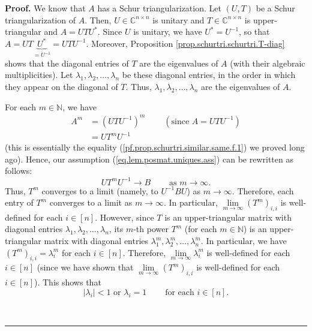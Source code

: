 \documentclass[numbers=enddot,12pt,final,onecolumn,notitlepage]{scrartcl}%
\numberwithin{exer}{subsection}
\theoremstyle{definition}
\newenvironment{proof}[1][Proof]{\noindent\textbf{#1.} }{\ \rule{0.5em}{0.5em}}
\begin{document}
\begin{proof}
We know that $A$ has a Schur triangularization. Let $\left(  U,T\right)  $ be
a Schur triangularization of $A$. Then, $U\in\mathbb{C}^{n\times n}$ is
unitary and $T\in\mathbb{C}^{n\times n}$ is upper-triangular and $A=UTU^{\ast
}$. Since $U$ is unitary, we have $U^{\ast}=U^{-1}$, so that
$A=UT\underbrace{U^{\ast}}_{=U^{-1}}=UTU^{-1}$. Moreover, Proposition
\ref{prop.schurtri.schurtri.T-diag} shows that the diagonal entries of $T$ are
the eigenvalues of $A$ (with their algebraic multiplicities). Let $\lambda
_{1},\lambda_{2},\ldots,\lambda_{n}$ be these diagonal entries, in the order
in which they appear on the diagonal of $T$. Thus, $\lambda_{1},\lambda
_{2},\ldots,\lambda_{n}$ are the eigenvalues of $A$.

For each $m\in\mathbb{N}$, we have%
\begin{align*}
A^{m}  &  =\left(  UTU^{-1}\right)  ^{m}\ \ \ \ \ \ \ \ \ \ \left(
\text{since }A=UTU^{-1}\right) \\
&  =UT^{m}U^{-1}%
\end{align*}
(this is essentially the equality (\ref{pf.prop.schurtri.similar.same.f.1}) we
proved long ago). Hence, our assumption (\ref{eq.lem.posmat.uniques.ass}) can
be rewritten as follows:
\begin{equation}
UT^{m}U^{-1}\rightarrow B\ \ \ \ \ \ \ \ \ \ \text{as }m\rightarrow\infty.
\label{pf.lem.posmat.uniques.1}%
\end{equation}
Thus, $T^{m}$ converges to a limit (namely, to $U^{-1}BU$) as $m\rightarrow
\infty$. Therefore, each entry of $T^{m}$ converges to a limit as
$m\rightarrow\infty$. In particular, $\lim\limits_{m\rightarrow\infty}\left(
T^{m}\right)  _{i,i}$ is well-defined for each $i\in\left[  n\right]  $.
However, since $T$ is an upper-triangular matrix with diagonal entries
$\lambda_{1},\lambda_{2},\ldots,\lambda_{n}$, its $m$-th power $T^{m}$ (for
each $m\in\mathbb{N}$) is an upper-triangular matrix with diagonal entries
$\lambda_{1}^{m},\lambda_{2}^{m},\ldots,\lambda_{n}^{m}$. In particular, we
have $\left(  T^{m}\right)  _{i,i}=\lambda_{i}^{m}$ for each $i\in\left[
n\right]  $. Therefore, $\lim\limits_{m\rightarrow\infty}\lambda_{i}^{m}$ is
well-defined for each $i\in\left[  n\right]  $ (since we have shown that
$\lim\limits_{m\rightarrow\infty}\left(  T^{m}\right)  _{i,i}$ is well-defined
for each $i\in\left[  n\right]  $). This shows that
\begin{equation}
\left\vert \lambda_{i}\right\vert <1\text{ or }\lambda_{i}%
=1\ \ \ \ \ \ \ \ \ \ \text{for each }i\in\left[  n\right]  .
\label{pf.lem.posmat.uniques.2}%
\end{equation}



\end{proof}
\end{document}
